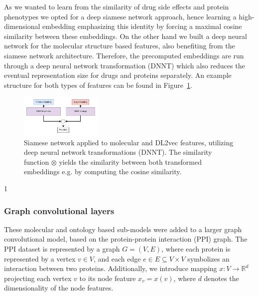 \documentclass{bioinfo}
\begin{document}
As we wanted to learn from the similarity of drug side effects and
protein phenotypes we opted for a deep siamese network approach, hence
learning a high-dimensional embedding emphasizing this identity by
forcing a maximal cosine similarity between these embeddings. On the
other hand we built a deep neural network for the molecular structure
based features, also benefiting from the siamese network
architecture. Therefore, the precomputed embeddings are run through a
deep neural network transformation (DNNT) which also reduces the
eventual representation size for drugs and proteins separately. An
example structure for both types of features can be found in
Figure~\ref{fig:SiameseNetwork}.

\begin{figure}[!tpb]%
	\centerline{\includegraphics[width=0.35\textwidth]{figures/siamese_network.png}}
	\caption{Siamese network applied to molecular and DL2vec
          features, utilizing deep neural network transformations
          (DNNT). The similarity function $\otimes$ yields the
          similarity between both transformed embeddings e.g. by
          computing the cosine similarity.}
	\label{fig:SiameseNetwork}
\end{figure}

1
\subsubsection{Graph convolutional layers}
These molecular and ontology based sub-models were added to a larger
graph convolutional model, based on the protein-protein interaction
(PPI) graph. The PPI dataset is represented by a graph $G=(V,E)$,
where each protein is represented by a vertex $v\in V$, and each edge
$e\in E\subseteq V\times V$ symbolizes an interaction between two
proteins. Additionally, we introduce mapping
$x:V\rightarrow\mathbb{R}^{d}$ projecting each vertex $v$ to its node
feature $x_v = x(v)$, where $d$ denotes the dimensionality of the node
features.
 
\end{document}
